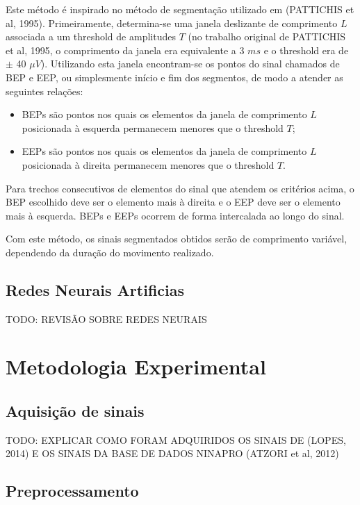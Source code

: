 \documentclass[
	12pt,				%
	openright,			%
	oneside,
	a4paper,			%
	english,			%
	francais,				%
	spanish,			%
	brazil				%
	]{abntex2}
\begin{document}
	Este método é inspirado no método de segmentação utilizado em (PATTICHIS et al, 1995). Primeiramente, determina-se uma janela deslizante de comprimento $L$ associada a um threshold de amplitudes $T$ (no trabalho original de PATTICHIS et al, 1995, o comprimento da janela era equivalente a 3 $ms$ e o threshold era de $\pm$ 40 $\mu V$). Utilizando esta janela encontram-se os pontos do sinal chamados de BEP e EEP, ou simplesmente início e fim dos segmentos, de modo a atender as seguintes relações:

\begin{itemize}
\item{BEPs são pontos nos quais os elementos da janela de comprimento $L$ posicionada à esquerda permanecem menores que o threshold $T$;}
\item{EEPs são pontos nos quais os elementos da janela de comprimento $L$ posicionada à direita permanecem menores que o threshold $T$.}
\end{itemize}

	Para trechos consecutivos de elementos do sinal que atendem os critérios acima, o BEP escolhido deve ser o elemento mais à direita e o EEP deve ser o elemento mais à esquerda. BEPs e EEPs ocorrem de forma intercalada ao longo do sinal.
	
	Com este método, os sinais segmentados obtidos serão de comprimento variável, dependendo da duração do movimento realizado.
\section{Redes Neurais Artificias}

	TODO: REVISÃO SOBRE REDES NEURAIS

\chapter{Metodologia Experimental}

\section{Aquisição de sinais}

	TODO: EXPLICAR COMO FORAM ADQUIRIDOS OS SINAIS DE (LOPES, 2014) E OS SINAIS DA BASE DE DADOS NINAPRO (ATZORI et al, 2012)

\section{Preprocessamento}
\end{document}
